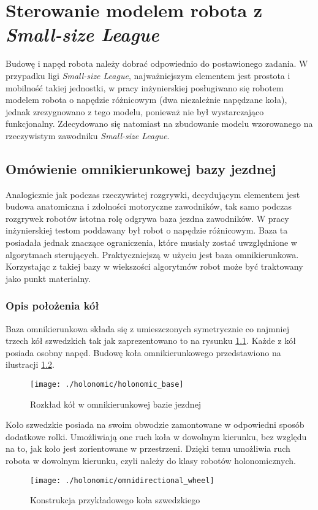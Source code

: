 \chapter[Sterowanie modelem robota z \emph{Small-size League}]{Sterowanie modelem robota z \emph{Small-size League} \label{chap:holonomic}}
Budowę i napęd robota należy dobrać odpowiednio do postawionego zadania. W przypadku ligi \emph{Small-size League}, najważniejszym elementem jest prostota i mobilność
takiej jednostki, w pracy inżynierskiej \cite{inzynierka} posługiwano się robotem modelem robota o napędzie różnicowym (dwa niezależnie napędzane koła), jednak
zrezygnowano z tego modelu, ponieważ nie był wystarczająco funkcjonalny. Zdecydowano się natomiast na zbudowanie modelu wzorowanego na rzeczywistym zawodniku \emph{Small-size League}.  
\section{Omówienie omnikierunkowej bazy jezdnej}
Analogicznie jak podczas rzeczywistej rozgrywki, decydującym elementem jest budowa anatomiczna i zdolności motoryczne zawodników, tak samo podczas
rozgrywek robotów istotna rolę odgrywa baza jezdna zawodników. W pracy inżynierskiej testom poddawany był robot o napędzie różnicowym. Baza ta posiadała jednak 
znaczące ograniczenia, które musiały zostać uwzględnione w algorytmach sterujących. Praktyczniejszą w użyciu jest baza omnikierunkowa. Korzystając z takiej bazy w
wiekszości algorytmów robot może być traktowany jako punkt materialny.
\subsection{Opis położenia kół}
Baza omnikierunkowa składa się z umieszczonych symetrycznie co najmniej trzech kół szwedzkich tak jak zaprezentowano to na rysunku \ref{fig:holonomic_base}.
Każde z kół posiada osobny napęd. Budowę koła omnikierunkowego przedstawiono na ilustracji \ref{fig:omnidirectional_wheel}. 
\begin{figure}[h]
\centering
\texttt{[image: ./holonomic/holonomic\_base]}
\caption{ Rozkład kół w omnikierunkowej bazie jezdnej }\label{fig:holonomic_base}
\end{figure}
Koło szwedzkie posiada na swoim
obwodzie zamontowane w odpowiedni sposób dodatkowe rolki. Umożliwiają one ruch koła w dowolnym kierunku, bez względu na to, 
jak koło jest zorientowane w przestrzeni. Dzięki temu umożliwia ruch robota w dowolnym kierunku, czyli należy do klasy robotów holonomicznych.
\begin{figure}[h]
\centering
\texttt{[image: ./holonomic/omnidirectional\_wheel]}
\caption{ Konstrukcja przykładowego koła szwedzkiego }\label{fig:omnidirectional_wheel}
\end{figure}
